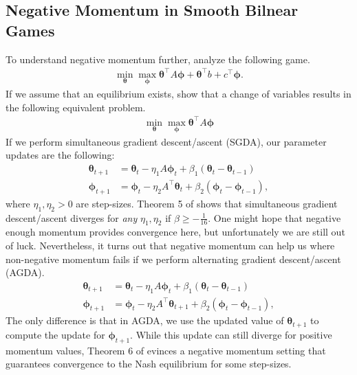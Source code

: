 \documentclass{article}
\newcommand{\btheta}[0]{\ensuremath{\boldsymbol{\theta}}}
\newcommand{\bphi}[0]{\ensuremath{\boldsymbol{\phi}}}
\begin{document}
\subsection{Negative Momentum in Smooth Bilnear Games}
To understand negative momentum further, \citet{Gidel18NegMom} analyze the following game.
\begin{align*}
    \min_{\btheta} \max_{\bphi} \btheta^\top A \bphi + \btheta^\top b  + c^\top \bphi.
\end{align*}
If we assume that an equilibrium exists, \citet{Gidel18NegMom} show that a change of variables results in the following equivalent problem.
\begin{align}\label{eq:smooth-bilinear-game}
    \min_{\btheta} \max_{\bphi} \btheta^\top A \bphi
\end{align}
If we perform simultaneous gradient descent/ascent (SGDA), our parameter updates are the following:
\begin{align*}
    \btheta_{t + 1} &= \btheta_t - \eta_1 A \bphi_t  + \beta_1(\btheta_t - \btheta_{t - 1})\\
    \bphi_{t + 1} &= \bphi_t - \eta_2 A^\top \btheta_t  + \beta_2(\bphi_t - \bphi_{t - 1}),
\end{align*}
where $\eta_1, \eta_2 > 0$ are step-sizes. Theorem 5 of \citet{Gidel18NegMom} shows that simultaneous gradient descent/ascent diverges for \textit{any} $\eta_1, \eta_2$ if $\beta \geq -\frac{1}{16}$. One might hope that negative enough momentum provides convergence here, but unfortunately we are still out of luck. Nevertheless, it turns out that negative momentum can help us where non-negative momentum fails if we perform alternating gradient descent/ascent (AGDA).
\begin{align*}
    \btheta_{t + 1} &= \btheta_t - \eta_1 A \bphi_t  + \beta_1(\btheta_t - \btheta_{t - 1})\\
    \bphi_{t + 1} &= \bphi_t - \eta_2 A^\top \btheta_{t + 1}  + \beta_2(\bphi_t - \bphi_{t - 1}),
\end{align*}
The only difference is that in AGDA, we use the updated value of $\btheta_{t + 1}$ to compute the update for $\bphi_{t + 1}$. While this update can still diverge for positive momentum values, Theorem 6 of \citet{Gidel18NegMom} evinces a negative momentum setting that guarantees convergence to the Nash equilibrium for some step-sizes. 

\end{document}
